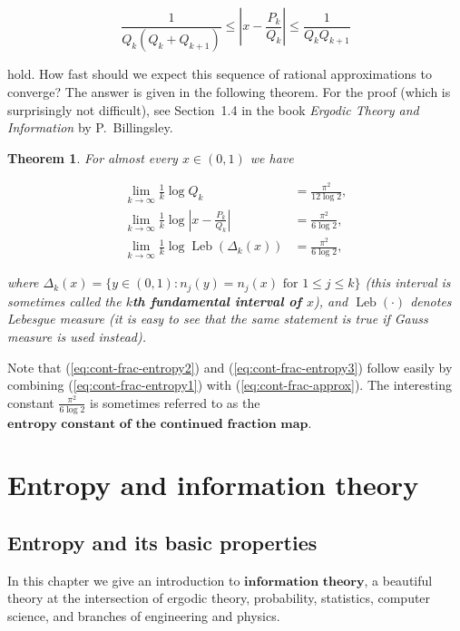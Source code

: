 \documentclass[11pt]{report}
\theoremstyle{plain}
\newtheorem{thm}{Theorem}[chapter]
\theoremstyle{definition}
\begin{document}
\begin{enumerate}[label=\arabic*.]
\begin{equation*} \tag{22}\label{eq:cont-frac-approx}
\frac{1}{Q_k (Q_k+Q_{k+1})} \le \left|x - \frac{P_k}{Q_k} \right| \le \frac{1}{Q_k Q_{k+1}}
\end{equation*}

hold. How fast should we expect this sequence of rational approximations to converge? The answer is given in the following theorem. For the proof (which is surprisingly not difficult), see Section~1.4 in the book \emph{Ergodic Theory and Information} by P.\ Billingsley.

\begin{thm}
For almost every $x\in (0,1)$ we have

\begin{align*}
\lim_{k\to\infty} \frac{1}{k}\log Q_k &= \tag{23}\label{eq:cont-frac-entropy1} \frac{\pi^2}{12\log 2},
\\
\lim_{k\to\infty} \frac{1}{k}\log \left| x-\frac{P_k}{Q_k} \right| &= \tag{24}\label{eq:cont-frac-entropy2} \frac{\pi^2}{6\log 2},
\\
\lim_{k\to\infty} \frac{1}{k}\log \operatorname{Leb}(\Delta_k(x)) &= \tag{25}\label{eq:cont-frac-entropy3} \frac{\pi^2}{6\log 2},
\end{align*}

where $\Delta_k(x) = \{ y\in (0,1) : n_j(y)=n_j(x) \textrm{ for }1\le j\le k\}$ (this interval is sometimes called the \textbf{$k$th fundamental interval of $x$}), and $\operatorname{Leb}(\cdot)$ denotes Lebesgue measure (it is easy to see that the same statement is true if Gauss measure is used instead).
\end{thm}

Note that (\ref{eq:cont-frac-entropy2}) and (\ref{eq:cont-frac-entropy3}) follow easily by combining (\ref{eq:cont-frac-entropy1}) with (\ref{eq:cont-frac-approx}). The interesting constant $\frac{\pi^2}{6\log 2}$ is sometimes referred to as the $\textbf{entropy constant of the continued fraction map}$.
\end{enumerate}

\chapter{Entropy and information theory}

\section{Entropy and its basic properties}
In this chapter we give an introduction to $\textbf{information theory}$, a beautiful theory at the intersection of ergodic theory, probability, statistics, computer science, and branches of engineering and physics.
\end{document}
